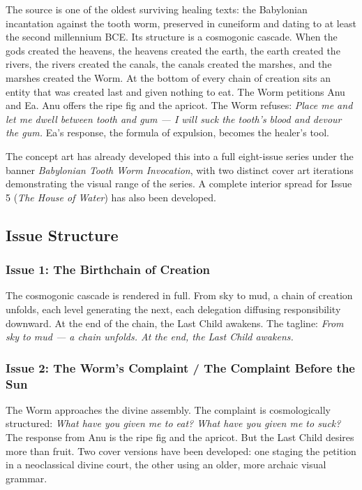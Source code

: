 \documentclass[12pt, a4paper]{article}
\begin{document}
The source is one of the oldest surviving healing texts: the Babylonian incantation against the tooth worm, preserved in cuneiform and dating to at least the second millennium BCE. Its structure is a cosmogonic cascade. When the gods created the heavens, the heavens created the earth, the earth created the rivers, the rivers created the canals, the canals created the marshes, and the marshes created the Worm. At the bottom of every chain of creation sits an entity that was created last and given nothing to eat. The Worm petitions Anu and Ea. Anu offers the ripe fig and the apricot. The Worm refuses: \textit{Place me and let me dwell between tooth and gum --- I will suck the tooth's blood and devour the gum.} Ea's response, the formula of expulsion, becomes the healer's tool.

The concept art has already developed this into a full eight-issue series under the banner \textit{Babylonian Tooth Worm Invocation}, with two distinct cover art iterations demonstrating the visual range of the series. A complete interior spread for Issue 5 (\textit{The House of Water}) has also been developed.

\subsection{Issue Structure}

\subsubsection{Issue 1: The Birthchain of Creation}

The cosmogonic cascade is rendered in full. From sky to mud, a chain of creation unfolds, each level generating the next, each delegation diffusing responsibility downward. At the end of the chain, the Last Child awakens. The tagline: \textit{From sky to mud --- a chain unfolds. At the end, the Last Child awakens.}

\subsubsection{Issue 2: The Worm's Complaint / The Complaint Before the Sun}

The Worm approaches the divine assembly. The complaint is cosmologically structured: \textit{What have you given me to eat? What have you given me to suck?} The response from Anu is the ripe fig and the apricot. But the Last Child desires more than fruit. Two cover versions have been developed: one staging the petition in a neoclassical divine court, the other using an older, more archaic visual grammar.
\end{document}
